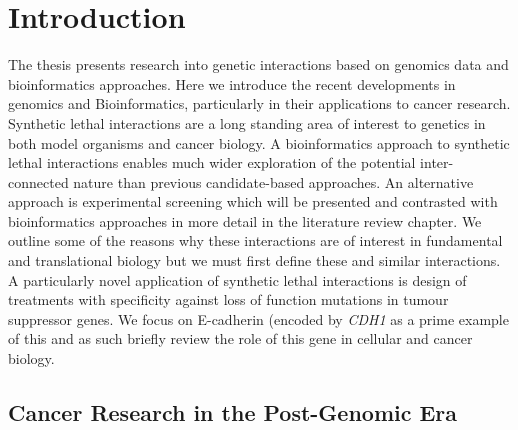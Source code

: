 \chapter{Introduction}
\label{chap:intro}



The thesis presents research into genetic interactions based on genomics data and bioinformatics approaches. Here we introduce the recent developments in genomics and Bioinformatics, particularly in their applications to cancer research. Synthetic lethal interactions are a long standing area of interest to genetics in both model organisms and cancer biology. A bioinformatics approach to synthetic lethal interactions enables much wider exploration of the potential inter-connected nature than previous candidate-based approaches. An alternative approach is experimental screening which will be presented and contrasted with bioinformatics approaches in more detail in the literature review chapter. We outline some of the reasons why these interactions are of interest in fundamental and translational biology but we must first define these and similar interactions. A particularly novel application of synthetic lethal interactions is design of treatments with specificity against loss of function mutations in tumour suppressor genes. We focus on E-cadherin (encoded by \textit{CDH1} as a prime example of this and as such briefly review the role of this gene in cellular and cancer biology.   



\section{Cancer Research in the Post-Genomic Era}

